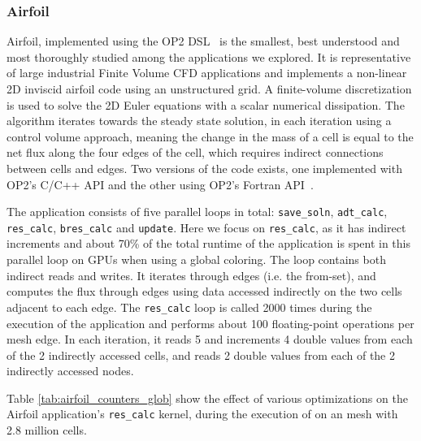 \subsubsection{Airfoil}

Airfoil, implemented using the OP2 DSL~\cite{op2} is the smallest, best 
understood and most thoroughly studied among the applications we explored. It is 
representative of large industrial Finite Volume CFD applications and implements 
a non-linear 2D inviscid airfoil code using an unstructured grid. A 
finite-volume discretization is used to solve the 2D Euler equations with a 
scalar numerical dissipation. The algorithm iterates towards the steady state 
solution, in each iteration using a control volume approach, meaning the change 
in the mass of a cell is equal to the net flux along the four edges of the cell, 
which requires indirect connections between cells and edges. Two versions of the 
code exists, one implemented with OP2's C/C++ API and the other using OP2's 
Fortran API~\cite{giles2012op2,op2-repo}.

The application consists of five parallel loops in total: \texttt{save\_soln}, 
\texttt{adt\_calc}, \texttt{res\_calc}, \texttt{bres\_calc} and \texttt{update}.
Here we focus on \texttt{res\_calc}, as it has indirect increments and about 
70\% of the total runtime of the application is spent in this parallel loop on 
GPUs when using a global coloring. The loop contains both indirect reads and 
writes. It iterates through edges (i.e. the from-set), and computes the flux 
through edges using data accessed indirectly on the two cells adjacent to each 
edge. The \texttt{res\_calc} loop is called 2000 times during the  
execution of the application and performs about 100 floating-point operations 
per mesh edge. In each iteration, it reads 5 and increments 4 double values from 
each of the 2 indirectly accessed cells, and reads 2 double values from each of 
the 2 indirectly accessed nodes. 

Table \ref{tab:airfoil_counters_glob} show the effect of various optimizations 
on the Airfoil application's \texttt{res\_calc} kernel, during the execution of 
on an mesh with 2.8 million cells.


